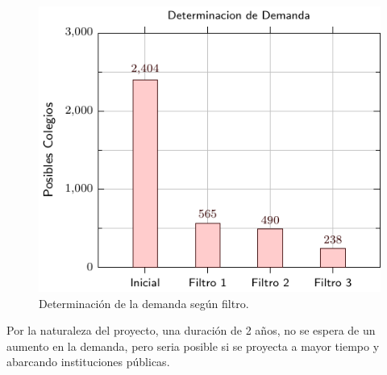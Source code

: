 \begin{figure}
  \centering
  \includegraphics[width=0.75\linewidth]{./Figures/bar-plot-demand.pdf}
  \caption{Determinación de la demanda según filtro.}
\end{figure}

Por la naturaleza del proyecto, una duración de 2 años, no se espera de un
aumento en la demanda, pero seria posible si se proyecta a mayor tiempo
y abarcando instituciones públicas.
